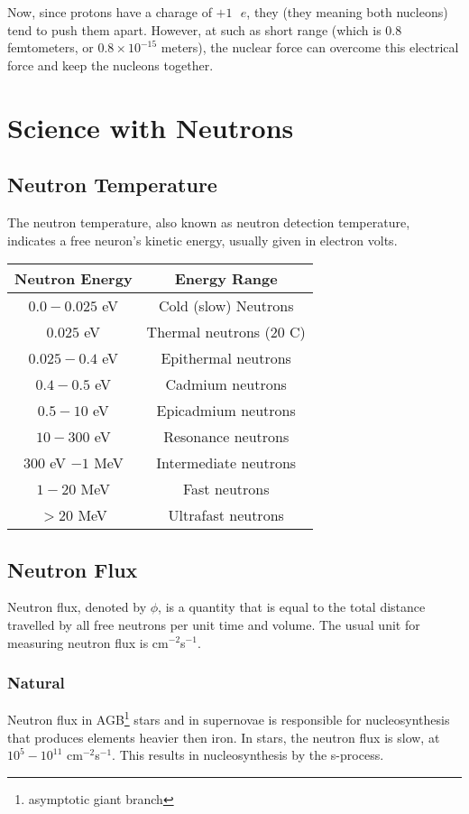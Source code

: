 \documentclass{article}
\begin{document}
\begin{multicols*}{2}
    Now, since protons have a charage of $+1\text{ }e$, they (they meaning
    both nucleons) tend to push them apart. However, at such as short range
    (which is $0.8$ femtometers, or $0.8 \times 10^{-15}$ meters), the nuclear
    force can overcome this electrical force and keep the nucleons together.

    \section{Science with Neutrons}

    \subsection{Neutron Temperature}
    The neutron temperature, also known as neutron detection temperature,
    indicates a free neuron's kinetic energy, usually given in electron volts.\\
    
    \begin{tabular}{|c|c|}
      \hline
      \textbf{Neutron Energy} & \textbf{Energy Range} \\
      \hline
      $0.0 - 0.025$ eV & Cold (slow) Neutrons \\
      $0.025$ eV & Thermal neutrons ($20$ C) \\
      $0.025-0.4$ eV & Epithermal neutrons \\
      $0.4-0.5$ eV & Cadmium neutrons \\
      $0.5-10$ eV & Epicadmium neutrons \\
      $10-300$ eV & Resonance neutrons \\
      $300$ eV $- 1$ MeV & Intermediate neutrons \\
      $1-20$ MeV & Fast neutrons \\
      $> 20$ MeV & Ultrafast neutrons \\
      \hline
    \end{tabular}
    \subsection{Neutron Flux}
    Neutron flux, denoted by $\phi$, is a quantity that is equal to the total
    distance travelled by all free neutrons per unit time and volume. The usual
    unit for measuring neutron flux is cm$^{-2}$s$^{-1}$.
    \subsubsection{Natural}
    Neutron flux in AGB\footnote{asymptotic giant branch} stars and in supernovae
    is responsible for nucleosynthesis that produces elements heavier then iron.
    In stars, the neutron flux is slow, at $10^{5} - 10^{11}$ cm$^{-2}$s$^{-1}$.
    This results in nucleosynthesis by the s-process.


\end{multicols*}
\end{document}
